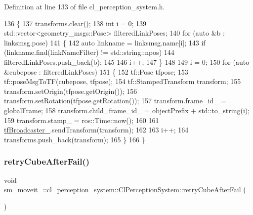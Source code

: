 Definition at line 133 of file cl\+\_\+perception\+\_\+system.\+h.


\begin{DoxyCode}
136   \{
137     transforms.clear();
138     \textcolor{keywordtype}{int} i = 0;
139     std::vector<geometry\_msgs::Pose> filteredLinkPoses;
140     \textcolor{keywordflow}{for} (\textcolor{keyword}{auto} &b : linksmsg.pose)
141     \{
142       \textcolor{keyword}{auto} linkname = linksmsg.name[i];
143       \textcolor{keywordflow}{if} (linkname.find(linkNameFilter) != std::string::npos)
144         filteredLinkPoses.push\_back(b);
145 
146       i++;
147     \}
148 
149     i = 0;
150     \textcolor{keywordflow}{for} (\textcolor{keyword}{auto} &cubepose : filteredLinkPoses)
151     \{
152       tf::Pose tfpose;
153       tf::poseMsgToTF(cubepose, tfpose);
154       tf::StampedTransform transform;
155       transform.setOrigin(tfpose.getOrigin());
156       transform.setRotation(tfpose.getRotation());
157       transform.frame\_id\_ = globalFrame;
158       transform.child\_frame\_id\_ = objectPrefix + std::to\_string(i);
159       transform.stamp\_ = ros::Time::now();
160 
161       \hyperlink{classsm__moveit__3_1_1cl__perception__system_1_1ClPerceptionSystem_a4b10961feb7c1609a6260656f20798d8}{tfBroadcaster\_}.sendTransform(transform);
162 
163       i++;
164       transforms.push\_back(transform);
165     \}
166   \}
\end{DoxyCode}
\mbox{\label{classsm__moveit__3_1_1cl__perception__system_1_1ClPerceptionSystem_a06bf8ed0f64662a6dde713f5678476f5}} 
\subsubsection{\texorpdfstring{retry\+Cube\+After\+Fail()}{retryCubeAfterFail()}}
{\footnotesize\ttfamily void sm\+\_\+moveit\+\_\+::cl\+\_\+perception\+\_\+system\+::\+Cl\+Perception\+System\+::retry\+Cube\+After\+Fail (\begin{DoxyParamCaption}{ }\end{DoxyParamCaption})\hspace{0.3cm}{\ttfamily [inline]}}



